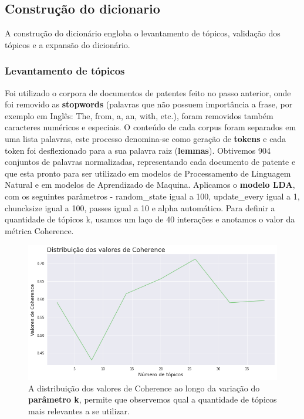\subsection{Construção do dicionario}

A construção do dicionário engloba o levantamento de tópicos, validação dos tópicos e a expansão do dicionário.

\subsubsection{Levantamento de tópicos}

Foi utilizado o corpora de documentos de patentes feito no passo anterior, onde foi removido as \textbf{stopwords} (palavras que não possuem importância a frase, por exemplo em Inglês: The, from, a, an, with, etc.), foram removidos também caracteres numéricos e especiais. O conteúdo de cada corpus foram separados em uma lista palavras, este processo denomina-se como geração de \textbf{tokens} e cada token foi desflexionado para a sua palavra raiz (\textbf{lemmas}). Obtivemos 904 conjuntos de palavras normalizadas, representando cada documento de patente e que esta pronto para ser utilizado em modelos de Processamento de Linguagem Natural e em modelos de Aprendizado de Maquina.
Aplicamos o \textbf{modelo LDA}, com os seguintes parâmetros - random\_state igual a 100, update\_every igual a 1, chuncksize igual a 100, passes igual a 10 e alpha automático. Para definir a quantidade de tópicos k, usamos um laço de 40 interações e anotamos o valor da métrica Coherence.

\begin{figure}[ht!]
	\centering
	\includegraphics[scale=0.6]{imagens/distr_dos_valores_de_coherence.png}
	\caption{A distribuição dos valores de Coherence ao longo da variação do \textbf{parâmetro k}, permite que observemos qual a quantidade de tópicos mais relevantes a se utilizar.
			 \label{dist_coherence_image}}
\end{figure}

